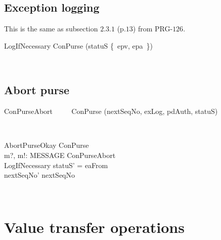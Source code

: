 \subsection{Exception logging}

This is the same as subsection $2.3.1$ (p.$13$) from PRG-$126$.
\begin{LSDef}
\begin{schema}{LogIfNecessary}
   \Delta ConPurse
\where
   \IF (statuS \in \{~epv, epa~\}) \THEN 
   		[|exLog' = exLog \cup \{~pdAuth~\}]
   \ELSE
   		[|exLog' = exLog \cup \emptyset]
\end{schema}~\end{LSDef}

\subsection{Abort purse}

\begin{LSDef}
\begin{zed}
   ConPurseAbort ~~~~ ConPurse \hide (nextSeqNo, exLog, pdAuth, statuS)
\end{zed}~\end{LSDef}

\begin{LSDef}
\begin{schema}{AbortPurseOkay}
   \Delta ConPurse \\
   m?, m!: MESSAGE
\where
  \Xi ConPurseAbort \\
  LogIfNecessary
  \also
  statuS' = eaFrom \\
  nextSeqNo' \geq nextSeqNo \\
\end{schema}~\end{LSDef}

\section{Value transfer operations}\label{ch4.valTransferOp}

